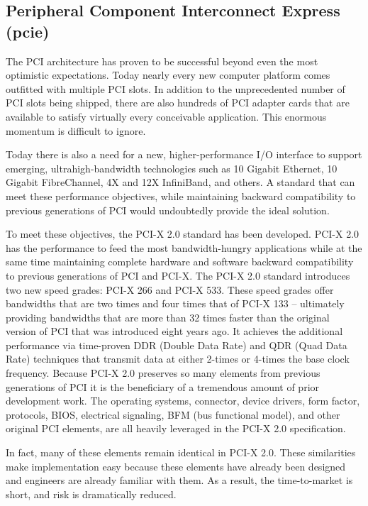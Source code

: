 \subsection{Peripheral Component Interconnect Express (\gls{pcie})}
The PCI architecture has proven to be successful beyond even the most optimistic expectations. Today nearly every new computer platform comes outfitted with multiple PCI slots. In addition to the unprecedented number of PCI slots being shipped, there are also hundreds of PCI adapter cards that are available to satisfy virtually every conceivable application. This enormous momentum is difficult to ignore.

Today there is also a need for a new, higher-performance I/O interface to support emerging, ultrahigh-bandwidth technologies such as 10 Gigabit Ethernet, 10 Gigabit FibreChannel, 4X and 12X InfiniBand, and others. A standard that can meet these performance objectives, while maintaining backward compatibility to previous generations of PCI would undoubtedly provide the ideal solution.

To meet these objectives, the PCI-X 2.0 standard has been developed. PCI-X 2.0 has the performance to feed the most bandwidth-hungry applications while at the same time maintaining complete hardware and software backward compatibility to previous generations of PCI and PCI-X. The PCI-X 2.0 standard introduces two new speed grades: PCI-X 266 and PCI-X 533. These speed grades offer bandwidths that are two times and four times that of PCI-X 133 -- ultimately providing bandwidths that are more than 32 times faster than the original version of PCI that was introduced eight years ago. It achieves the additional performance via time-proven DDR (Double Data Rate) and QDR (Quad Data Rate) techniques that transmit data at either 2-times or 4-times the base clock frequency. Because PCI-X 2.0 preserves so many elements from previous generations of PCI it is the beneficiary of a tremendous amount of prior development work. The operating systems, connector, device drivers, form factor, protocols, BIOS, electrical signaling, BFM (bus functional model), and other original PCI elements, are all heavily leveraged in the PCI-X 2.0 specification.

In fact, many of these elements remain identical in PCI-X 2.0. These similarities make implementation easy because these elements have already been designed and engineers are already familiar with them. As a result, the time-to-market is short, and risk is dramatically reduced.

